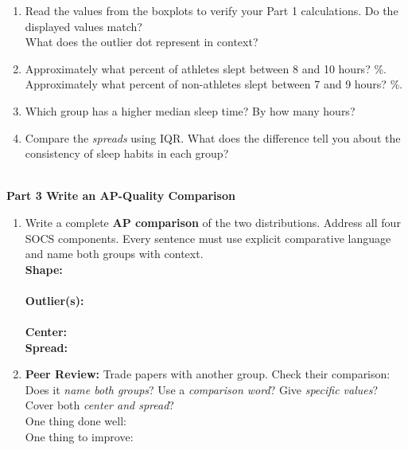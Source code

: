 \documentclass[10pt]{article}
\begin{document}
\begin{enumerate}[leftmargin=1.5em, itemsep=8pt, resume]

  \item Read the values from the boxplots to verify your Part 1 calculations.
        Do the displayed values match? \blank{3cm}\\[4pt]
        What does the outlier dot represent in context?\\[5pt]
        \writeline

  \item Approximately what percent of athletes slept between 8 and 10 hours?
        \blank{3cm}\%.\\[4pt]
        Approximately what percent of non-athletes slept between 7 and 9 hours?
        \blank{3cm}\%.

  \item Which group has a higher median sleep time? By how many hours?\\[5pt]
        \writeline

  \item Compare the \textit{spreads} using IQR. What does the difference tell
        you about the consistency of sleep habits in each group?\\[5pt]
        \writeline\\[1pt]\writeline

\end{enumerate}

\vspace{0.12in}

{\large\bfseries\color{navy} Part 3 \quad Write an AP-Quality Comparison}

\vspace{0.10in}

\begin{enumerate}[leftmargin=1.5em, itemsep=8pt, resume]

  \item Write a complete \textbf{AP comparison} of the two distributions.
        Address all four SOCS components. Every sentence must use explicit
        comparative language and name both groups with context.\\[6pt]
        \textbf{Shape:} \writeline\\[1pt]\writeline\\[6pt]
        \textbf{Outlier(s):} \writeline\\[1pt]\writeline\\[6pt]
        \textbf{Center:} \writeline\\[6pt]
        \textbf{Spread:} \writeline\\[1pt]\writeline

  \item \textbf{Peer Review:} Trade papers with another group. Check their
        comparison: Does it \textit{name both groups}? Use a \textit{comparison
        word}? Give \textit{specific values}? Cover both \textit{center and
        spread}?\\[5pt]
        One thing done well: \writeline\\[4pt]
        One thing to improve: \writeline

\end{enumerate}
\end{document}

